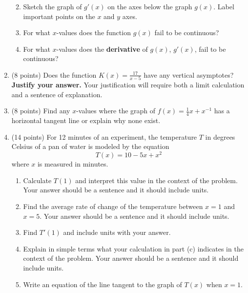 \documentclass[12pt]{article}
\begin{document}
\begin{enumerate}
\begin{enumerate}
\item Sketch the graph of $g'(x)$ on the axes below the graph $g(x).$ Label important points on the $x$ and $y$ axes.
\vspace{.4in}
\item For what $x$-values does the function $g(x)$ fail to be continuous?
\vfill
\item For what $x$-values does the \textbf{derivative} of $g(x)$, $g'(x)$, fail to be continuous?
\vfill
\end{enumerate}
\vspace{0.3in}

\newpage
\item (8 points) Does the function $K(x)=\frac{17}{x-5}$ have any vertical asymptotes? \textbf{Justify your answer.} Your justification will require both a limit calculation and a sentence of explanation.
\vfill
\item (8 points) Find any $x$-values where the graph of $f(x)=\frac{1}{4}x+x^{-1}$ has a horizontal tangent line or explain why none exist. 
\vfill
\newpage
\item (14 points) For 12 minutes of an experiment, the temperature $T$ in degrees Celsius of a pan of water is modeled by the equation 
$$T(x)=10-5x+x^2$$ where $x$ is measured in minutes. 
	\begin{enumerate}
	\item Calculate $T(1)$ and interpret this value in the context of the problem. Your answer should be a sentence and it should include units.
	\vfill
	\item Find the average rate of change of the temperature between $x=1$ and $x=5.$ Your answer should be a sentence and it should include units.
	\vfill
	\item Find $T'(1)$ and include units with your answer.
	\vfill
	\item Explain in simple terms what your calculation in part (c) indicates in the context of the problem. Your answer should be a sentence and it should include units.
	\vfill
	\item Write an equation of the line tangent to the graph of $T(x)$ when $x=1.$
	\vfill
	\end{enumerate}
\newpage


\end{enumerate}
\end{document}
